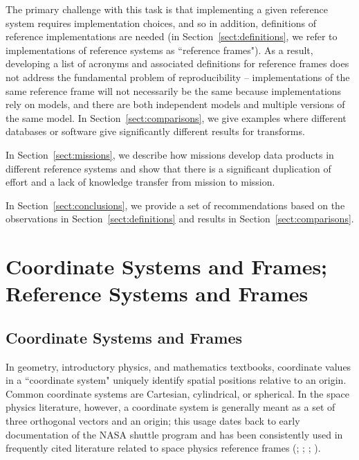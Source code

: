 \documentclass[draft]{agujournal2019}
\begin{document}
The primary challenge with this task is that implementing a given reference system requires implementation choices, and so in addition, definitions of reference implementations are needed (in Section~\ref{sect:definitions}, we refer to implementations of reference systems as ``reference frames"). As a result, developing a list of acronyms and associated definitions for reference frames does not address the fundamental problem of reproducibility -- implementations of the same reference frame will not necessarily be the same because implementations rely on models, and there are both independent models and multiple versions of the same model. In Section~\ref{sect:comparisons}, we give examples where different databases or software give significantly different results for transforms. 

In Section~\ref{sect:missions}, we describe how missions develop data products in different reference systems and show that there is a significant duplication of effort and a lack of knowledge transfer from mission to mission.

In Section~\ref{sect:conclusions}, we provide a set of recommendations based on the observations in Section~\ref{sect:definitions} and results in Section~\ref{sect:comparisons}.

\section{Coordinate Systems and Frames; Reference Systems and Frames}
\label{sect:terminology}

\subsection{Coordinate Systems and Frames}

In geometry, introductory physics, and mathematics textbooks, coordinate values in a ``coordinate system" uniquely identify spatial positions relative to an origin. Common coordinate systems are Cartesian, cylindrical, or spherical. In the space physics literature, however, a coordinate system is generally meant as a set of three orthogonal vectors and an origin; this usage dates back to early documentation of the NASA shuttle program \cite{NASA1965} and has been consistently used in frequently cited literature related to space physics reference frames (; ; ; ).

\end{document}
